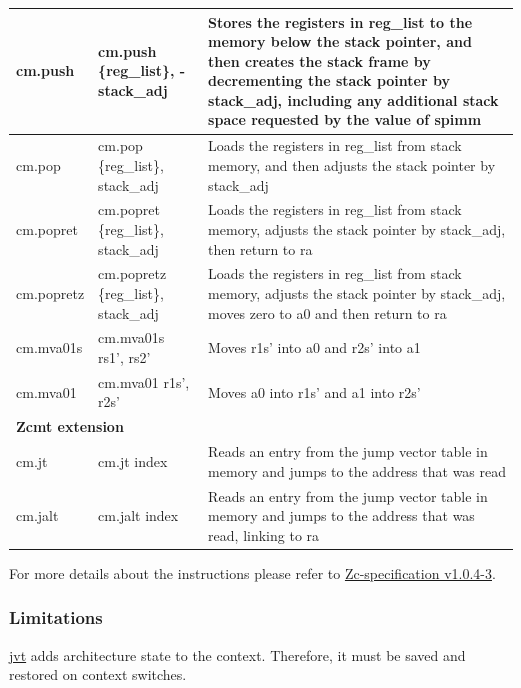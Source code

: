 \documentclass[main\_\_EN.tex]{subfiles}
\begin{document}
\begin{longtable}{ | p{2.0cm} | p{4.0cm} |  p{10.0cm} | }
cm.push & cm.push \{reg\_list\}, -stack\_adj & Stores the registers in reg\_list to the memory below the stack pointer, and then creates the stack frame by decrementing the stack pointer by stack\_adj, including any additional stack space requested by the value of spimm\\\hline
cm.pop & cm.pop \{reg\_list\}, stack\_adj & Loads the registers in reg\_list from stack memory, and then adjusts the stack pointer by stack\_adj \\\hline
cm.popret & cm.popret \{reg\_list\}, stack\_adj & Loads the registers in reg\_list from stack memory, adjusts the stack pointer by stack\_adj, then return to ra\\\hline
cm.popretz & cm.popretz \{reg\_list\}, stack\_adj & Loads the registers in reg\_list from stack memory, adjusts the stack pointer by stack\_adj, moves zero to a0 and then return to ra\\\hline
cm.mva01s & cm.mva01s rs1', rs2' &  Moves r1s' into a0 and r2s' into a1\\\hline
cm.mva01 & cm.mva01 r1s', r2s' & Moves a0 into r1s' and a1 into r2s' \\\hline

\multicolumn{3}{|l|}{\textbf{Zcmt extension}} \\\hline

cm.jt & cm.jt index & Reads an entry from the jump vector table in memory and jumps to the address that was read \\\hline
cm.jalt & cm.jalt index & Reads an entry from the jump vector table in memory and jumps to the address that was read, linking to ra  \\\hline

\end{longtable}

For more details about the instructions please refer to \href{https://github.com/riscvarchive/riscv-code-size-reduction/blob/v1.0.4-3/Zc-specification/Zc.adoc}{Zc-specification v1.0.4-3}.

\subsubsection{Limitations}
\label{sec:riscvcpu-zc-limit-descr}

\hyperref[regdesc:JVT]{jvt} adds architecture state to the context. Therefore, it must be saved and restored on context switches.

\end{document}
